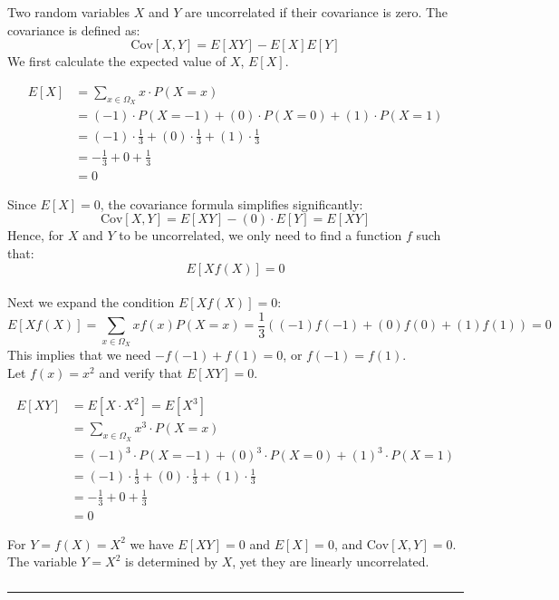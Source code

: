 \documentclass{article}
\begin{document}
\begin{flushleft}
    Two random variables $X$ and $Y$ are uncorrelated if their covariance is zero. The covariance is defined as:
    $$ \text{Cov}[X, Y] = E[XY] - E[X]E[Y] $$
    We first calculate the expected value of $X$, $E[X]$.
\end{flushleft}
\begin{align*}
    E[X] &= \sum_{x \in \Omega_X} x \cdot P(X=x) \\
         &= (-1) \cdot P(X=-1) + (0) \cdot P(X=0) + (1) \cdot P(X=1) \\
         &= (-1) \cdot \frac{1}{3} + (0) \cdot \frac{1}{3} + (1) \cdot \frac{1}{3} \\
         &= -\frac{1}{3} + 0 + \frac{1}{3} \\
         &= 0
\end{align*}
\parbox{\textwidth}{
    Since $E[X] = 0$, the covariance formula simplifies significantly:
    $$ \text{Cov}[X, Y] = E[XY] - (0) \cdot E[Y] = E[XY] $$
    Hence, for $X$ and $Y$ to be uncorrelated, we only need to find a function $f$ such that:
    $$E[X f(X)] = 0$$\\
    Next we expand the  condition $E[X f(X)] = 0$:\\
    $$ E[X f(X)] = \sum_{x \in \Omega_X} x f(x) P(X=x) = \frac{1}{3} \left( (-1)f(-1) + (0)f(0) + (1)f(1) \right) = 0 $$
    This implies that we need $-f(-1) + f(1) = 0$, or $f(-1) = f(1)$.\\

    Let $f(x) = x^{2}$ and verify that $E[XY] = 0$.
}

\begin{align*}
    E[XY] &= E[X \cdot X^2] = E[X^3] \\
          &= \sum_{x \in \Omega_X} x^3 \cdot P(X=x) \\
          &= (-1)^3 \cdot P(X=-1) + (0)^3 \cdot P(X=0) + (1)^3 \cdot P(X=1) \\
          &= (-1) \cdot \frac{1}{3} + (0) \cdot \frac{1}{3} + (1) \cdot \frac{1}{3} \\
          &= -\frac{1}{3} + 0 + \frac{1}{3} \\
          &= 0
\end{align*}

\begin{flushleft}
    For $Y = f(X) = X^{2}$ we have $E[XY] = 0$ and $E[X]=0$, and $\text{Cov}[X, Y] = 0$. The variable $Y=X^2$ is determined by $X$, yet they are linearly uncorrelated.
\end{flushleft}

\subsubsection*{}

\noindent\rule{\textwidth}{0.4pt}\\
\end{document}
